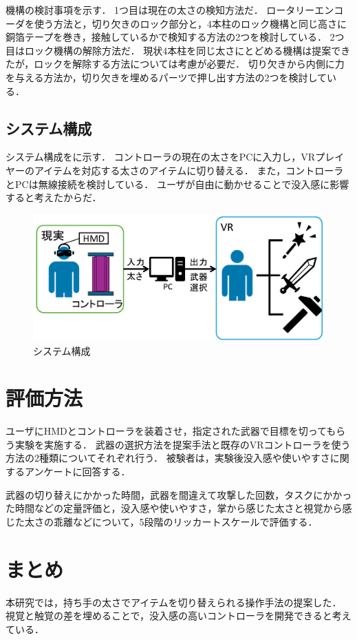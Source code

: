 \documentclass[uplatex]{jsarticle}
\begin{document}
機構の検討事項を示す．
1つ目は現在の太さの検知方法だ．
ロータリーエンコーダを使う方法と，切り欠きのロック部分と，4本柱のロック機構と同じ高さに銅箔テープを巻き，接触しているかで検知する方法の2つを検討している．
2つ目はロック機構の解除方法だ．
現状4本柱を同じ太さにとどめる機構は提案できたが，ロックを解除する方法については考慮が必要だ．
切り欠きから内側に力を与える方法か，切り欠きを埋めるパーツで押し出す方法の2つを検討している．

\subsection{システム構成}

システム構成をに示す．
コントローラの現在の太さをPCに入力し，VRプレイヤーのアイテムを対応する太さのアイテムに切り替える．
また，コントローラとPCは無線接続を検討している．
ユーザが自由に動かせることで没入感に影響すると考えたからだ．

\begin{figure}
    \centering
    \includegraphics[width=0.9\linewidth]{fig/構成図.png}
    \caption{システム構成}
    \label{fig:system}
\end{figure}


\section{評価方法}

ユーザにHMDとコントローラを装着させ，指定された武器で目標を切ってもらう実験を実施する．
武器の選択方法を提案手法と既存のVRコントローラを使う方法の2種類についてそれぞれ行う．
被験者は，実験後没入感や使いやすさに関するアンケートに回答する．

武器の切り替えにかかった時間，武器を間違えて攻撃した回数，タスクにかかった時間などの定量評価と，没入感や使いやすさ，掌から感じた太さと視覚から感じた太さの乖離などについて，5段階のリッカートスケールで評価する．

\section{まとめ}

本研究では，持ち手の太さでアイテムを切り替えられる操作手法の提案した．
視覚と触覚の差を埋めることで，没入感の高いコントローラを開発できると考えている．





\end{document}
